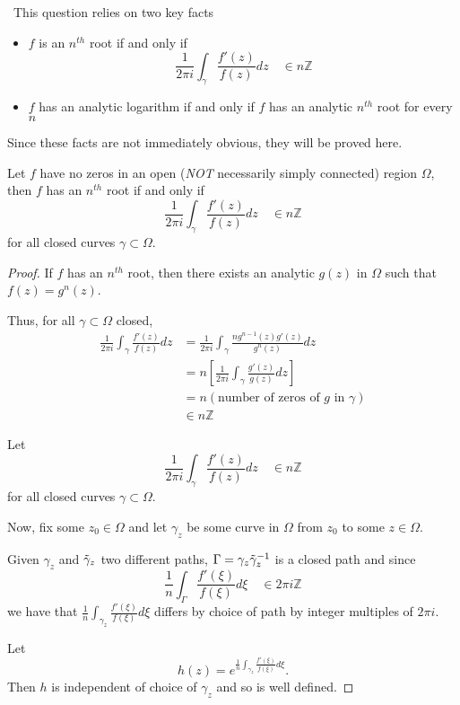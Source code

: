 \documentclass[12pt]{Qual}
\begin{document}
\begin{solution}$\,$
This question relies on two key facts

\begin{itemize}[leftmargin=2.5cm]
    \item $f$ is an $n^{th}$ root if and only if $$\frac{1}{2\pi i}\int_\gamma\frac{f'(z)}{f(z)}dz\quad\in n\mathbb{Z}$$
    \item $f$ has an analytic logarithm if and only if $f$ has an analytic $n^{th}$ root for every $n$
\end{itemize}

Since these facts are not immediately obvious, they will be proved here.

\begin{claim} Let $f$ have no zeros in an open (\textit{NOT} necessarily simply connected) region $\Omega$, then $f$ has an $n^{th}$ root if and only if $$\frac{1}{2\pi i}\int_{\gamma}\frac{f'(z)}{f(z)}dz\quad\in n\mathbb{Z}$$ for all closed curves $\gamma\subset\Omega$.
\begin{proof} \boxed{\implies} If $f$ has an $n^{th}$ root, then there exists an analytic $g(z)$ in $\Omega$ such that $f(z)=g^n(z)$.

Thus, for all $\gamma\subset\Omega$ closed, \begin{align*}
    \frac{1}{2\pi i}\int_\gamma\frac{f'(z)}{f(z)}dz&=\frac{1}{2\pi i}\int_\gamma\frac{ng^{n-1}(z)g'(z)}{g^n(z)}dz\\
    &=n\left[\frac{1}{2\pi i}\int_\gamma\frac{g'(z)}{g(z)}dz\right]\\
    &=n(\text{number of zeros of }g\text{ in }\gamma)\\
    &\in n\mathbb{Z}
\end{align*}

\boxed{\impliedby} Let $$\frac{1}{2\pi i}\int_{\gamma}\frac{f'(z)}{f(z)}dz\quad\in n\mathbb{Z}$$ for all closed curves $\gamma\subset\Omega$.

Now, fix some $z_0\in\Omega$ and let $\gamma_z$ be some curve in $\Omega$ from $z_0$ to some $z\in\Omega$.

Given $\gamma_z$ and $\Tilde{\gamma}_z$ two different paths, $\Gamma=\gamma_z\Tilde{\gamma}_z^{-1}$ is a closed path and since $$\frac{1}{n}\int_\Gamma\frac{f'(\xi)}{f(\xi)}d\xi\quad\in 2\pi i\mathbb{Z}$$ we have that $\displaystyle \frac{1}{n}\int_{\gamma_z}\frac{f'(\xi)}{f(\xi)}d\xi$ differs by choice of path by integer multiples of $2\pi i.$

Let $$h(z)=e^{\frac{1}{n}\int_{\gamma_z}\frac{f'(\xi)}{f(\xi)}d\xi}.$$ Then $h$ is independent of choice of $\gamma_z$ and so is well defined.


\end{proof}
\end{claim}
\end{solution}
\end{document}
